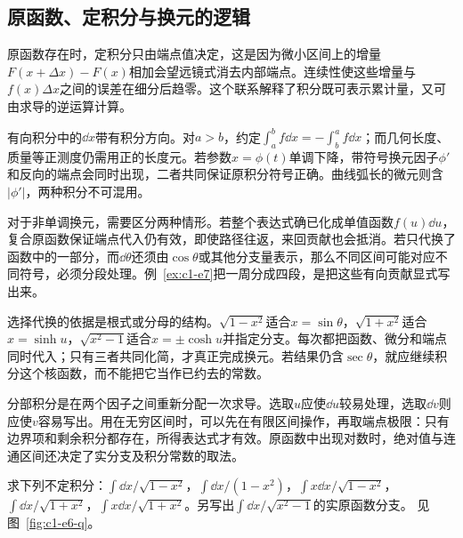 \subsection{原函数、定积分与换元的逻辑}
原函数存在时，定积分只由端点值决定，这是因为微小区间上的增量$F(x+\Delta x)-F(x)$相加会望远镜式消去内部端点。连续性使这些增量与$f(x)\Delta x$之间的误差在细分后趋零。这个联系解释了积分既可表示累计量，又可由求导的逆运算计算。

有向积分中的$\dd x$带有积分方向。对$a>b$，约定$\int_a^bf\dd x=-\int_b^af\dd x$；而几何长度、质量等正测度仍需用正的长度元。若参数$x=\phi(t)$单调下降，带符号换元因子$\phi'$和反向的端点会同时出现，二者共同保证原积分符号正确。曲线弧长的微元则含$|\phi'|$，两种积分不可混用。

对于非单调换元，需要区分两种情形。若整个表达式确已化成单值函数$f(u)\dd u$，复合原函数保证端点代入仍有效，即使路径往返，来回贡献也会抵消。若只代换了函数中的一部分，而$\dd\theta$还须由$\cos\theta$或其他分支量表示，那么不同区间可能对应不同符号，必须分段处理。例~\ref{ex:c1-e7}把一周分成四段，是把这些有向贡献显式写出来。

选择代换的依据是根式或分母的结构。$\sqrt{1-x^2}$适合$x=\sin\theta$，$\sqrt{1+x^2}$适合$x=\sinh u$，$\sqrt{x^2-1}$适合$x=\pm\cosh u$并指定分支。每次都把函数、微分和端点同时代入；只有三者共同化简，才真正完成换元。若结果仍含$\sec\theta$，就应继续积分这个核函数，而不能把它当作已约去的常数。

分部积分是在两个因子之间重新分配一次求导。选取$u$应使$\dd u$较易处理，选取$\dd v$则应使$v$容易写出。用在无穷区间时，可以先在有限区间操作，再取端点极限：只有边界项和剩余积分都存在，所得表达式才有效。原函数中出现对数时，绝对值与连通区间还决定了实分支及积分常数的取法。

\begin{example}[五种积分与反函数]\label{ex:c1-e6}
求下列不定积分：$\int\dd x/\sqrt{1-x^2}$，$\int\dd x/(1-x^2)$，$\int x\dd x/\sqrt{1-x^2}$，$\int\dd x/\sqrt{1+x^2}$，$\int x\dd x/\sqrt{1+x^2}$。另写出$\int\dd x/\sqrt{x^2-1}$的实原函数分支。 见图~\ref{fig:c1-e6-q}。
\end{example}

